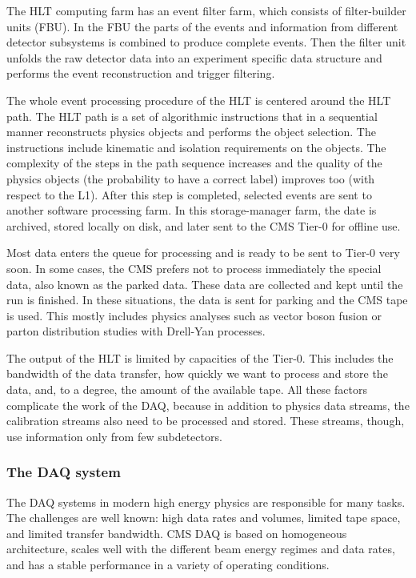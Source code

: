 \begin{normalsize}
The HLT computing farm has an event filter farm, which consists of filter-builder units (FBU). In the FBU the parts of the events and information from different detector subsystems is combined to produce complete events. Then the filter unit unfolds the raw detector data into an experiment specific data structure and performs the event reconstruction and trigger filtering. 


The whole event processing procedure of the HLT is centered around the HLT path. The HLT path is a set of algorithmic instructions that in a sequential manner reconstructs physics objects and performs the object selection. The instructions include kinematic and isolation requirements on the objects. The complexity of the steps in the path sequence increases and the quality of the physics objects (the probability to have a correct label) improves too (with respect to the L1). After this step is completed, selected events are sent to another software processing farm. In this storage-manager farm, the date is archived, stored locally on disk, and later sent to the CMS Tier-0 for offline use. 

Most data enters the queue for processing and is ready to be sent to Tier-0 very soon. In some cases, the CMS prefers not to process immediately the special data, also known as the parked data. These data are collected and kept until the run is finished. In these situations, the data is sent for parking and the CMS tape is used. This mostly includes physics analyses such as vector boson fusion or parton distribution studies with Drell-Yan processes.

The output of the HLT is limited by capacities of the Tier-0. This includes the bandwidth of the data transfer, how quickly we want to process and store the data, and, to a degree, the amount of the available tape. All these factors complicate the work of the DAQ, because in addition to physics data streams, the calibration streams also need to be processed and stored. These streams, though, use information only from few subdetectors. 



\subsubsection{The DAQ system}


The DAQ systems in modern high energy physics are responsible for many tasks. The challenges are well known: high data rates and volumes, limited tape space, and limited transfer bandwidth. CMS DAQ is based on homogeneous architecture, scales well with the different beam energy regimes and data rates, and has a stable performance in a variety of operating conditions. 


\end{normalsize}
